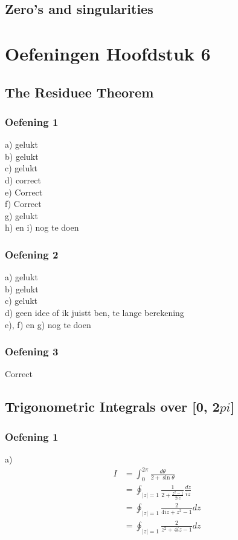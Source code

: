 \documentclass[a4paper,twoside]{article}
\theoremstyle{definition}
\theoremstyle{plain}
\begin{document}
\subsection{Zero's and singularities}
\section{Oefeningen Hoofdstuk 6}
\subsection{The Residuee Theorem}
\subsubsection{Oefening 1}
a) gelukt\\
b) gelukt\\
c) gelukt\\
d) correct\\
e) Correct\\
f) Correct\\
g) gelukt\\
h) en i) nog te doen\\
\subsubsection{Oefening 2}
a) gelukt\\
b) gelukt\\
c) gelukt\\
d) geen idee of ik juistt ben, te lange berekening\\
e), f) en g) nog te doen\\
\subsubsection{Oefening 3}
Correct\\
\subsection{Trigonometric Integrals over [0, 2\(pi\)]}
\subsubsection{Oefening 1}
a)
\begin{align*}
I &= \int_0^{2\pi} \frac{d\theta}{2 + \sin\theta} \\
&= \oint_{|z|=1} \frac{1}{2 + \frac{z^2 - 1}{2iz}} \frac{dz}{iz} \\
&= \oint_{|z|=1} \frac{2}{4iz + z^2 - 1} dz \\
&= \oint_{|z|=1} \frac{2}{z^2 + 4iz - 1} dz
\end{align*}
\end{document}

